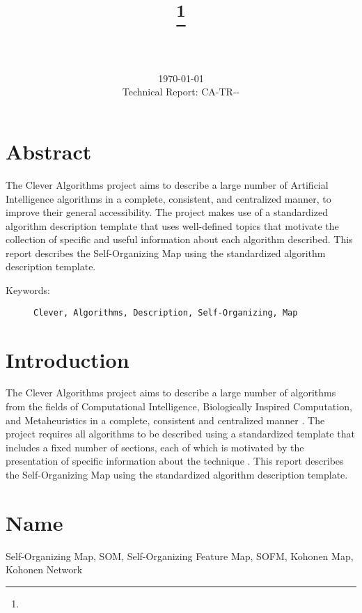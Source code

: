 \documentclass[a4paper, 11pt]{article}
\title{{\myreporttitle}\footnote{\myreportlicense}}
\author{\myreportauthor\\{\myreportemail}\\\small\myreportproject}
\date{\today\\{\small{Technical Report: CA-TR-{\myreportdate}-\myreportversion}}}
\begin{document}
\maketitle

\section*{Abstract} 
The Clever Algorithms project aims to describe a large number of Artificial Intelligence algorithms in a complete, consistent, and centralized manner, to improve their general accessibility. 
The project makes use of a standardized algorithm description template that uses well-defined topics that motivate the collection of specific and useful information about each algorithm described.
This report describes the Self-Organizing Map using the standardized algorithm description template.

\begin{description}
	\item[Keywords:] {\small\texttt{Clever, Algorithms, Description, Self-Organizing, Map}}
\end{description} 

\section{Introduction} 
\label{sec:intro}
The Clever Algorithms project aims to describe a large number of algorithms from the fields of Computational Intelligence, Biologically Inspired Computation, and Metaheuristics in a complete, consistent and centralized manner \cite{Brownlee2010}.
The project requires all algorithms to be described using a standardized template that includes a fixed number of sections, each of which is motivated by the presentation of specific information about the technique \cite{Brownlee2010a}.
This report describes the Self-Organizing Map using the standardized algorithm description template.

\section{Name} 
\label{sec:name}
Self-Organizing Map, SOM, Self-Organizing Feature Map, SOFM, Kohonen Map, Kohonen Network
\end{document}

